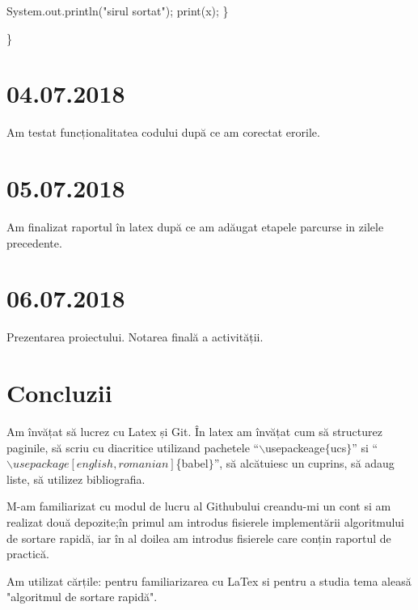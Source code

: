 \documentclass{report}
\begin{document}
       \hspace*{1cm}System.out.println("sirul sortat");\newline
       \hspace*{1cm}print(x);\newline
           \}\newline     
           
\}              

\chapter{04.07.2018}
Am testat funcționalitatea codului după ce am corectat erorile.

\chapter{05.07.2018}
Am finalizat raportul în latex după ce am adăugat etapele parcurse in zilele precedente.

\chapter{06.07.2018}
Prezentarea proiectului.
Notarea finală a activității.

\chapter{Concluzii}
\hspace*{0.3cm} Am învățat să lucrez cu Latex și Git. În latex am învățat cum să structurez paginile, să scriu cu diacritice utilizand pachetele  ``$\backslash$usepackeage$\{$ucs$\}$'' si ``$\backslash usepackage[english,romanian]$\{babel$\}$'', să alcătuiesc un cuprins, să adaug liste, să utilizez bibliografia.

M-am familiarizat cu modul de lucru al Githubului creandu-mi un cont si am realizat două depozite;în primul am introdus fisierele implementării algoritmului de sortare rapidă, iar în al doilea am introdus fisierele care conțin raportul de practică.

Am utilizat cărțile: \cite{book:1} pentru familiarizarea cu LaTex si \cite{book:2} pentru a studia tema aleasă "algoritmul de sortare rapidă". 

 
\newpage
 

\end{document}
